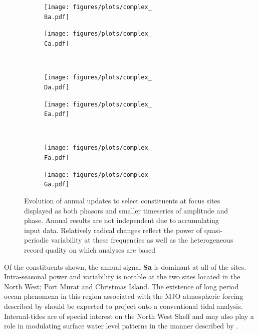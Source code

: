 
\begin{figure}[h]\centering
    \begin{subfigure}[b]{\figwidthHalf}
        \texttt{[image: figures/plots/complex\_\\Ba.pdf]}\caption{\Bname{}}
    \end{subfigure}
    \begin{subfigure}[b]{\figwidthHalf}
        \texttt{[image: figures/plots/complex\_\\Ca.pdf]}\caption{\Cname{}}
    \end{subfigure} 
    \\
    \begin{subfigure}[b]{\figwidthHalf}
        \texttt{[image: figures/plots/complex\_\\Da.pdf]}\caption{\Dname{}}
    \end{subfigure}
    \begin{subfigure}[b]{\figwidthHalf}
        \texttt{[image: figures/plots/complex\_\\Ea.pdf]}\caption{\Ename{}}
    \end{subfigure}
    \\
    \begin{subfigure}[b]{\figwidthHalf}
        \texttt{[image: figures/plots/complex\_\\Fa.pdf]} \caption{\Fname{}}
    \end{subfigure}
    \begin{subfigure}[b]{\figwidthHalf}
        \texttt{[image: figures/plots/complex\_\\Ga.pdf]} \caption{\Gname{}}
    \end{subfigure}
    \caption{Evolution of annual updates to select constituents at focus sites displayed as both phasors and smaller timeseries of amplitude and phase.  Annual results are not independent due to accumulating input data. Relatively radical changes reflect the power of quasi-periodic variability at these frequencies as well as the heterogeneous record quality on which analyses are based} 
    \label{fig:complexEvolution}
\end{figure}   

Of the constituents shown, the annual signal \textbf{Sa} is dominant at all of the sites.
Intra-seasonal power and variability is notable at the two sites located in the North West; Port Murat and Christmas Island.   The existence of long period ocean phenomena in this region associated with the MJO atmospheric forcing described by \citeauthor{Maxime:2019jc} should be expected to project onto a conventional tidal analysis.   Internal-tides are of special interest on the North West Shelf \citep{10.3389/fmars.2021.629372} and may also play a role in  modulating surface water level patterns in the manner described by \citeauthor{Colosi:2006va}.


